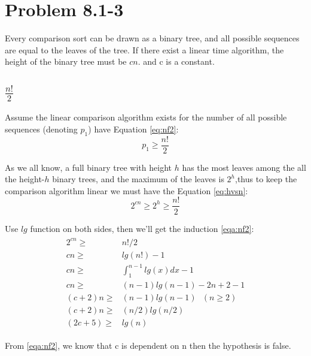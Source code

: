 \documentclass[oneside]{homework} %
\begin{document}
\maketitle
\newpage
\section{Problem 8.1-3}
Every comparison sort can be drawn as a binary tree, and all possible sequences are equal to the leaves of the tree. If there exist a linear time algorithm, the height of the binary tree must be 
\begin{math}
  cn
\end{math}.
and c is a constant.
\subsection{$\frac{n!}{2}$}

Assume the linear comparison algorithm exists for the number of all possible sequences (denoting $p_{1}$) have Equation \ref{eq:nf2}:
\begin{equation}
  \label{eq:nf2}
  p_{1}\geq\frac{n!}{2} 
\end{equation}

As we all know, a full binary tree with height $h$ has the most leaves among the all the height-$h$ binary trees, and the maximum of the leaves is $2^{h}$,thus to keep the comparison algorithm linear we must have the Equation \ref{eq:hvsn}:  
\begin{equation}
  2^{cn} \geq 2^{h} \geq \frac{n!}{2}
  \label{eq:hvsn}
\end{equation}

Use $lg$ function on both sides, then we'll get the induction \ref{eqa:nf2}:
\begin{eqnarray}
  \begin{split}
	2^{cn} \geq& n!/2 \\
	cn \geq& lg(n!) - 1 \\
	cn \geq& \int_{1}^{n-1}lg(x)dx -1 \\
	cn \geq& (n-1)lg(n-1) - 2n+2-1 \\
	(c+2)n \geq& (n-1)lg(n-1) ~ ~ ~  (n\geq2)\\
	(c+2)n \geq& (n/2)lg(n/2) \\
	(2c+5) \geq& lg(n)
  \end{split}
  \label{eqa:nf2}
\end{eqnarray}

From \ref{eqa:nf2}, we know that c is dependent on n then the hypothesis is false.
\end{document}
